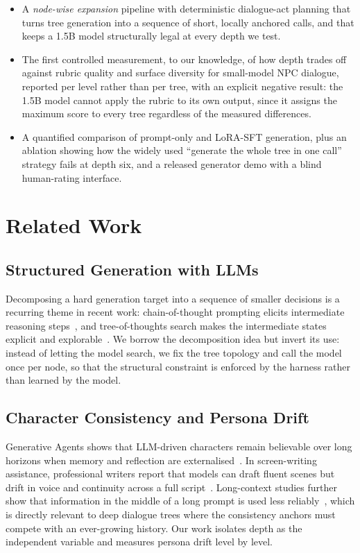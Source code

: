 \documentclass[conference]{IEEEtran}
\begin{document}
\begin{itemize}
\item A \emph{node-wise expansion} pipeline with deterministic dialogue-act planning that turns tree
generation into a sequence of short, locally anchored calls, and that keeps a 1.5B model structurally
legal at every depth we test.
\item The first controlled measurement, to our knowledge, of how depth trades off against rubric
quality and surface diversity for small-model NPC dialogue, reported per level rather than per tree,
with an explicit negative result: the 1.5B model cannot apply the rubric to its own output, since it
assigns the maximum score to every tree regardless of the measured differences.
\item A quantified comparison of prompt-only and LoRA-SFT generation, plus an ablation showing how
the widely used ``generate the whole tree in one call'' strategy fails at depth six, and a released
generator demo with a blind human-rating interface.
\end{itemize}

\section{Related Work}
\subsection{Structured Generation with LLMs}
Decomposing a hard generation target into a sequence of smaller decisions is a recurring theme in
recent work: chain-of-thought prompting elicits intermediate reasoning steps~\cite{cot2022}, and
tree-of-thoughts search makes the intermediate states explicit and explorable~\cite{tot2023}.
We borrow the decomposition idea but invert its use: instead of letting the model search, we fix
the tree topology and call the model once per node, so that the structural constraint is enforced
by the harness rather than learned by the model.

\subsection{Character Consistency and Persona Drift}
Generative Agents shows that LLM-driven characters remain believable over long horizons when
memory and reflection are externalised~\cite{genagents2023}. In screen-writing assistance,
professional writers report that models can draft fluent scenes but drift in voice and continuity
across a full script~\cite{cowriter2023}. Long-context studies further show that information in the
middle of a long prompt is used less reliably~\cite{lostmiddle2024}, which is directly relevant to
deep dialogue trees where the consistency anchors must compete with an ever-growing history.
Our work isolates depth as the independent variable and measures persona drift level by level.
\end{document}
